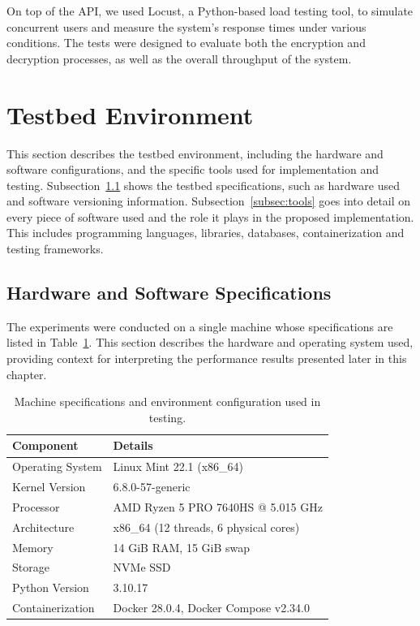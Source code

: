 \documentclass[cic,tc,english]{iiufrgs}
\numberwithin{algorithm}{chapter}
\begin{document}
        On top of the API, we used Locust, a Python-based load testing tool, to simulate concurrent users and measure the system's response times under various conditions. The tests were designed to evaluate both the encryption and decryption processes, as well as the overall throughput of the system.

    \section{Testbed Environment}
        \label{sec:testbed}
        This section describes the testbed environment, including the hardware and software configurations, and the specific tools used for implementation and testing. Subsection~\ref{subsec:hardware-software} shows the testbed specifications, such as hardware used and software versioning information. Subsection~\ref{subsec:tools} goes into detail on every piece of software used and the role it plays in the proposed implementation. This includes programming languages, libraries, databases, containerization and testing frameworks.

        \subsection{Hardware and Software Specifications}
        \label{subsec:hardware-software}
            The experiments were conducted on a single machine whose specifications are listed in Table~\ref{tab:machine_specs}. This section describes the hardware and operating system used, providing context for interpreting the performance results presented later in this chapter.

            \begin{table}[h]
                \centering
                \begin{tabular}{|l|l|}
                \hline
                \textbf{Component} & \textbf{Details} \\ \hline
                Operating System & Linux Mint 22.1 (x86\_64) \\ \hline
                Kernel Version & 6.8.0-57-generic \\ \hline
                Processor & AMD Ryzen 5 PRO 7640HS @ 5.015 GHz \\ \hline
                Architecture & x86\_64 (12 threads, 6 physical cores) \\ \hline
                Memory & 14 GiB RAM, 15 GiB swap \\ \hline
                Storage & NVMe SSD \\ \hline
                Python Version & 3.10.17 \\ \hline
                Containerization & Docker 28.0.4, Docker Compose v2.34.0 \\ \hline
                \end{tabular}
                \caption{Machine specifications and environment configuration used in testing.}
                \label{tab:machine_specs}
            \end{table}
\end{document}

